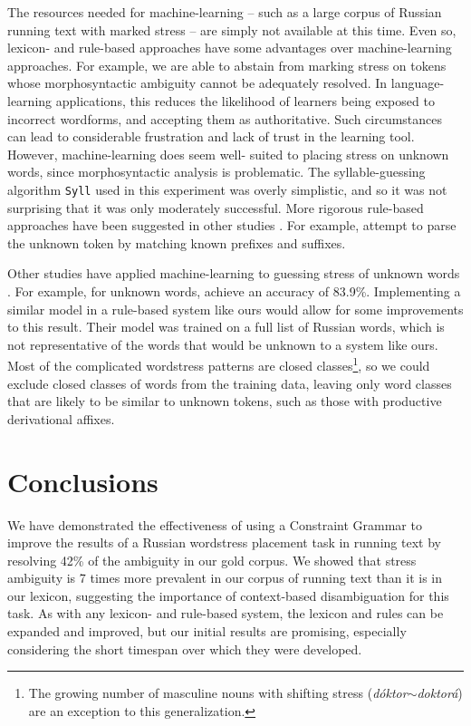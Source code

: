 \documentclass[11pt]{article}
\begin{document}
The resources needed for machine-learning --
such as a large corpus of Russian running text with marked stress -- are simply
not available at this time. Even so, lexicon- and rule-based approaches have
some advantages over machine-learning approaches. For example, we are able to
abstain from marking stress on tokens whose morphosyntactic ambiguity cannot be
adequately resolved. In language-learning applications, this reduces the 
likelihood of learners being exposed to incorrect wordforms, and accepting them
as authoritative. Such circumstances can lead to considerable frustration and
lack of trust in the learning tool. However, machine-learning does seem well-
suited to
placing stress on unknown words, since morphosyntactic analysis is problematic.
The syllable-guessing algorithm {\small {\tt Syll}} used in this experiment was 
overly simplistic, and so it was not surprising that it was only moderately 
successful. More rigorous rule-based approaches have been suggested in other 
studies \cite{Church-85,Williams-87,Xomicevic_2008}. For example, 
 attempt to parse the unknown token by matching known 
prefixes and suffixes.

Other studies have applied machine-learning to guessing stress of unknown words
\cite{Pearson.ea-00,Webster-04,Dou.ea-09,hall_sproat_russian_2013}. For example,
for unknown words,  achieve an accuracy of 
83.9\%. Implementing a similar model in a rule-based system like ours would allow 
for some improvements to this result. Their model was trained on a full list of 
Russian words, which is not representative of the words that would be unknown to 
a system like ours. Most of the complicated wordstress patterns are closed 
classes\footnote{The growing number of masculine nouns with shifting stress 
(\emph{d\'{o}ktor$\sim$doktor\'{a}}) are an exception to this generalization.},
so we could exclude closed classes of words from the training data, leaving only
word classes that are likely to be similar to unknown tokens, such as those with 
productive derivational affixes.

\section{Conclusions}

We have demonstrated the effectiveness of using a Constraint Grammar to improve
the results of a Russian wordstress placement task in running text by resolving
42\% of the ambiguity in our gold corpus. We showed
that stress ambiguity is 7 times more prevalent in our corpus of running text
than it is in our lexicon, suggesting the importance of context-based
disambiguation for this task.  As with any 
lexicon- and rule-based system, the lexicon and rules can be expanded and 
improved, but our initial results are promising, especially considering the short 
timespan over which they were developed.
\end{document}
